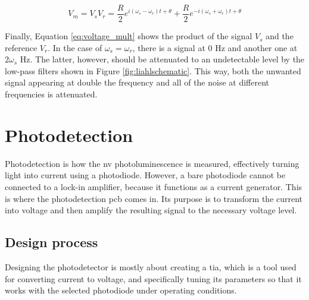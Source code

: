 \begin{equation}\label{eq:voltage_mult}
	V_m = V_sV_r = \frac{R}{2}e^{i(\omega_s -\omega_r)t  + \theta} + \frac{R}{2}e^{-i(\omega_s +\omega_r)t + \theta}
\end{equation}

Finally, Equation \ref{eq:voltage_mult} shows the product of the signal $V_s$ and the reference $V_r$. In the case of $\omega_s = \omega_r$, there is a signal at \num{0} \unit{\hertz} and another one at $2\omega_s$ \unit{\hertz}. The latter, however, should be attenuated to an undetectable level by the low-pass filters shown in Figure \ref{fig:liahlschematic}. This way, both the unwanted signal appearing at double the frequency and all of the noise at different frequencies is attenuated.

\section{Photodetection}
Photodetection is how the \gls{nv} photoluminescence is measured, effectively turning light into current using a photodiode. However, a bare photodiode cannot be connected to a lock-in amplifier, because it functions as a current generator. This is where the photodetection \gls {pcb} comes in. Its purpose is to transform the current into voltage and then amplify the resulting signal to the necessary voltage level. 

\subsection{Design process} \label{chap:photodetection_design}
Designing the photodetector is mostly about creating a \gls{tia}, which is a tool used for converting current to voltage, and specifically tuning its parameters so that it works with the selected photodiode under operating conditions. 


